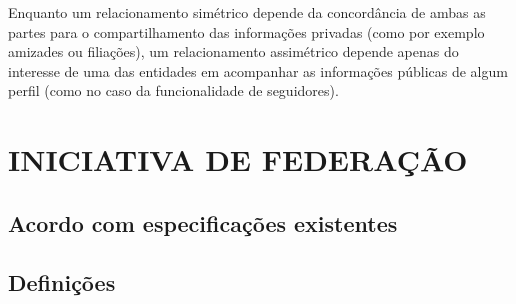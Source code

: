 Enquanto um relacionamento simétrico depende da concordância de ambas as partes para
o compartilhamento das informações privadas (como por exemplo amizades ou
filiações), um relacionamento assimétrico depende apenas do interesse de uma das
entidades em acompanhar as informações públicas de algum perfil (como no caso da
funcionalidade de seguidores).



\section{INICIATIVA DE FEDERAÇÃO}



\subsection{Acordo com especificações existentes}



\subsection{Definições}


